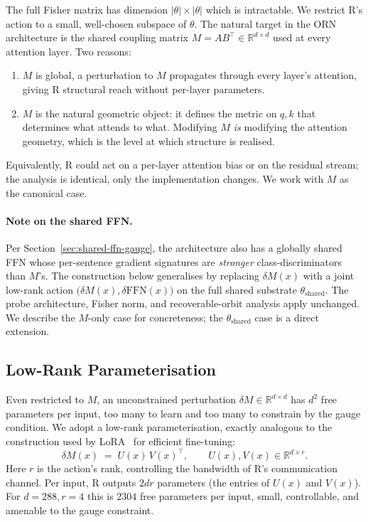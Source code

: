 \documentclass[11pt, a4paper]{article}
\theoremstyle{plain}
\theoremstyle{definition}
\theoremstyle{remark}
\begin{document}
The full Fisher matrix has dimension $|\theta| \times |\theta|$ which is intractable.
We restrict R's action to a small, well-chosen subspace of $\theta$.
The natural target in the ORN architecture is the shared coupling matrix $M = AB^{\!\top} \in \mathbb{R}^{d \times d}$ used at every attention layer.
Two reasons:
\begin{enumerate}[nosep]
\item $M$ is global, a perturbation to $M$ propagates through every layer's attention, giving R structural reach without per-layer parameters.
\item $M$ is the natural geometric object: it defines the metric on $q,k$ that determines what attends to what. Modifying $M$ \emph{is} modifying the attention geometry, which is the level at which structure is realised.
\end{enumerate}
Equivalently, R could act on a per-layer attention bias or on the residual stream; the analysis is identical, only the implementation changes.
We work with $M$ as the canonical case.

\paragraph{Note on the shared FFN.}
Per Section~\ref{sec:shared-ffn-gauge}, the architecture also has a globally shared FFN whose per-sentence gradient signatures are \emph{stronger} class-discriminators than $M$'s.
The construction below generalises by replacing $\delta M(x)$ with a joint low-rank action $\big(\delta M(x), \delta \mathrm{FFN}(x)\big)$ on the full shared substrate $\theta_{\mathrm{shared}}$.
The probe architecture, Fisher norm, and recoverable-orbit analysis apply unchanged.
We describe the $M$-only case for concreteness; the $\theta_{\mathrm{shared}}$ case is a direct extension.

\subsection{Low-Rank Parameterisation}

Even restricted to $M$, an unconstrained perturbation $\delta M \in \mathbb{R}^{d \times d}$ has $d^{2}$ free parameters per input, too many to learn and too many to constrain by the gauge condition.
We adopt a low-rank parameterisation, exactly analogous to the construction used by LoRA~\cite{hu2021lora} for efficient fine-tuning:
\begin{equation}
\delta M(x) \;=\; U(x)\, V(x)^{\!\top}, \qquad U(x), V(x) \in \mathbb{R}^{d \times r}.
\end{equation}
Here $r$ is the action's rank, controlling the bandwidth of R's communication channel.
Per input, R outputs $2 d r$ parameters (the entries of $U(x)$ and $V(x)$).
For $d = 288, r = 4$ this is $2304$ free parameters per input, small, controllable, and amenable to the gauge constraint.
\end{document}
